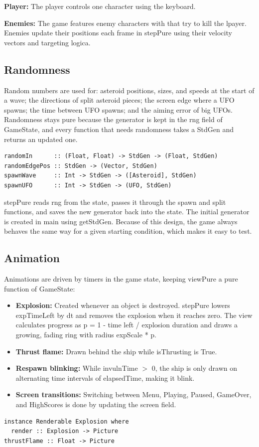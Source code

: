 \documentclass{article}
\begin{document}
\textbf{Player:} The player controls one character using the keyboard.

\textbf{Enemies:} The game features enemy characters with that try to kill the lpayer. Enemies update their positions each frame in stepPure using their velocity vectors and targeting logica.

\subsection{Randomness}
Random numbers are used for: asteroid positions, sizes, and speeds at the start of a wave; the directions of split asteroid pieces; the screen edge where a UFO spawns; the time between UFO spawns; and the aiming error of big UFOs. Randomness stays pure because the generator is kept in the rng field of GameState, and every function that needs randomness takes a StdGen and returns an updated one.
\begin{lstlisting}
randomIn      :: (Float, Float) -> StdGen -> (Float, StdGen)
randomEdgePos :: StdGen -> (Vector, StdGen)
spawnWave     :: Int -> StdGen -> ([Asteroid], StdGen)
spawnUFO      :: Int -> StdGen -> (UFO, StdGen)
\end{lstlisting}
stepPure reads rng from the state, passes it through the spawn and split functions, and saves the new generator back into the state. The initial generator is created in main using getStdGen. Because of this design, the game always behaves the same way for a given starting condition, which makes it easy to test.

\subsection{Animation}
Animations are driven by timers in the game state, keeping viewPure a pure function of GameState:
\begin{itemize}
  \item \textbf{Explosion:} Created whenever an object is destroyed. stepPure lowers expTimeLeft by dt and removes the explosion when it reaches zero. The view calculates progress as p = 1 - time left / explosion duration and draws a growing, fading ring with radius expScale * p.
  \item \textbf{Thrust flame:} Drawn behind the ship while isThrusting is True. 
  \item \textbf{Respawn blinking:} While invulnTime $>$ 0, the ship is only drawn on alternating time intervals of elapsedTime, making it blink.
  \item \textbf{Screen transitions:} Switching between Menu, Playing, Paused, GameOver, and HighScores is done by updating the screen field.
\end{itemize}
\begin{lstlisting}
instance Renderable Explosion where
  render :: Explosion -> Picture
thrustFlame :: Float -> Picture
\end{lstlisting}
\end{document}
